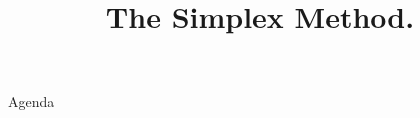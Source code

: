 \documentclass[../slides.tex]{subfiles}
\title{The Simplex Method.}
\begin{document}
\begin{frame}
  \maketitle
\end{frame}


\begin{frame}{Agenda}
  \tableofcontents
\end{frame}









\begin{frame}
  \maketitle
\end{frame}
\end{document}
